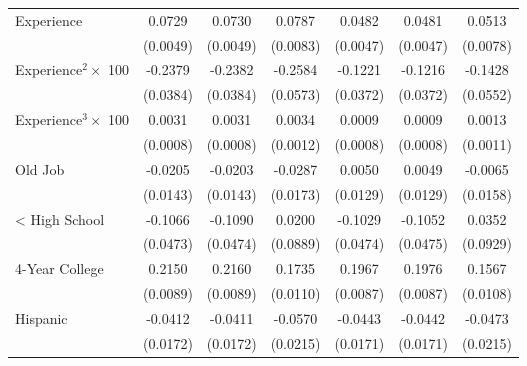 {\begin{longtable}{l*{6}{c}}
Experience          &      0.0729\sym{***}&      0.0730\sym{***}&      0.0787\sym{***}&      0.0482\sym{***}&      0.0481\sym{***}&      0.0513\sym{***}\\
                    &    (0.0049)         &    (0.0049)         &    (0.0083)         &    (0.0047)         &    (0.0047)         &    (0.0078)         \\
Experience$^2\times$ 100&     -0.2379\sym{***}&     -0.2382\sym{***}&     -0.2584\sym{***}&     -0.1221\sym{***}&     -0.1216\sym{***}&     -0.1428\sym{***}\\
                    &    (0.0384)         &    (0.0384)         &    (0.0573)         &    (0.0372)         &    (0.0372)         &    (0.0552)         \\
Experience$^3\times$ 100&      0.0031\sym{***}&      0.0031\sym{***}&      0.0034\sym{***}&      0.0009         &      0.0009         &      0.0013         \\
                    &    (0.0008)         &    (0.0008)         &    (0.0012)         &    (0.0008)         &    (0.0008)         &    (0.0011)         \\
Old Job             &     -0.0205         &     -0.0203         &     -0.0287\sym{*}  &      0.0050         &      0.0049         &     -0.0065         \\
                    &    (0.0143)         &    (0.0143)         &    (0.0173)         &    (0.0129)         &    (0.0129)         &    (0.0158)         \\
< High School       &     -0.1066\sym{**} &     -0.1090\sym{**} &      0.0200         &     -0.1029\sym{**} &     -0.1052\sym{**} &      0.0352         \\
                    &    (0.0473)         &    (0.0474)         &    (0.0889)         &    (0.0474)         &    (0.0475)         &    (0.0929)         \\
4-Year College      &      0.2150\sym{***}&      0.2160\sym{***}&      0.1735\sym{***}&      0.1967\sym{***}&      0.1976\sym{***}&      0.1567\sym{***}\\
                    &    (0.0089)         &    (0.0089)         &    (0.0110)         &    (0.0087)         &    (0.0087)         &    (0.0108)         \\
Hispanic            &     -0.0412\sym{**} &     -0.0411\sym{**} &     -0.0570\sym{***}&     -0.0443\sym{***}&     -0.0442\sym{***}&     -0.0473\sym{**} \\
                    &    (0.0172)         &    (0.0172)         &    (0.0215)         &    (0.0171)         &    (0.0171)         &    (0.0215)         \\

\end{longtable}}
